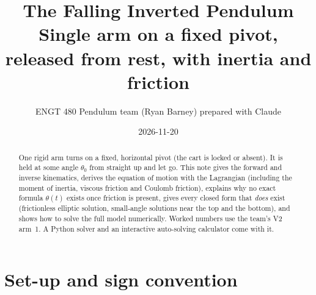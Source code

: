 \documentclass[10pt]{article}
\title{\textbf{The Falling Inverted Pendulum}\\[2pt]
\large Single arm on a fixed pivot, released from rest, with inertia and friction}
\author{ENGT 480 Pendulum team (Ryan Barney) \quad\textperiodcentered\quad prepared with Claude}
\date{2026-11-20}
\begin{document}
\maketitle

\begin{abstract}
\noindent One rigid arm turns on a fixed, horizontal pivot (the cart is locked or absent). It is held at some angle $\theta_0$ from straight up and let go. This note gives the forward and inverse kinematics, derives the equation of motion with the Lagrangian (including the moment of inertia, viscous friction and Coulomb friction), explains why no exact formula $\theta(t)$ exists once friction is present, gives every closed form that \emph{does} exist (frictionless elliptic solution, small-angle solutions near the top and the bottom), and shows how to solve the full model numerically. Worked numbers use the team's V2 arm~1. A Python solver and an interactive auto-solving calculator come with it.
\end{abstract}

\tableofcontents
\newpage

\section{Set-up and sign convention}
\end{document}
